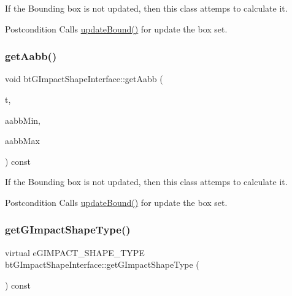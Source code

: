 If the Bounding box is not updated, then this class attemps to calculate it. 

\begin{DoxyPostcond}{Postcondition}
Calls \hyperlink{classbtGImpactShapeInterface_acb26c2d7a2aecabd06b996b72b848492}{update\+Bound()} for update the box set. 
\end{DoxyPostcond}
\mbox{\label{classbtGImpactShapeInterface_a03644dc230664957e43ed49b4a319d64}} 
\subsubsection{\texorpdfstring{get\+Aabb()}{getAabb()}\hspace{0.1cm}{\footnotesize\ttfamily [2/2]}}
{\footnotesize\ttfamily void bt\+G\+Impact\+Shape\+Interface\+::get\+Aabb (\begin{DoxyParamCaption}\item[{const bt\+Transform \&}]{t,  }\item[{bt\+Vector3 \&}]{aabb\+Min,  }\item[{bt\+Vector3 \&}]{aabb\+Max }\end{DoxyParamCaption}) const\hspace{0.3cm}{\ttfamily [inline]}}



If the Bounding box is not updated, then this class attemps to calculate it. 

\begin{DoxyPostcond}{Postcondition}
Calls \hyperlink{classbtGImpactShapeInterface_acb26c2d7a2aecabd06b996b72b848492}{update\+Bound()} for update the box set. 
\end{DoxyPostcond}
\mbox{\label{classbtGImpactShapeInterface_a25cacbe448997e3f8ec99cb2d4952859}} 
\subsubsection{\texorpdfstring{get\+G\+Impact\+Shape\+Type()}{getGImpactShapeType()}\hspace{0.1cm}{\footnotesize\ttfamily [1/2]}}
{\footnotesize\ttfamily virtual e\+G\+I\+M\+P\+A\+C\+T\+\_\+\+S\+H\+A\+P\+E\+\_\+\+T\+Y\+PE bt\+G\+Impact\+Shape\+Interface\+::get\+G\+Impact\+Shape\+Type (\begin{DoxyParamCaption}{ }\end{DoxyParamCaption}) const\hspace{0.3cm}{\ttfamily [pure virtual]}}



